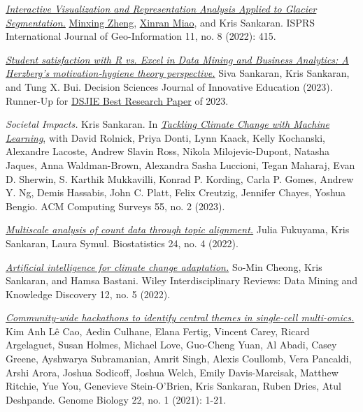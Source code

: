 \documentclass[letterpaper]{article}
\renewenvironment{itemize}{
  \begin{list}{}{
    \setlength{\leftmargin}{1.5em}
  }
}{
  \end{list}
}
\begin{document}
\begin{itemize}
  \item \href{https://doi.org/10.3390/ijgi11080415}{\textit{Interactive Visualization and Representation Analysis Applied to Glacier Segmentation.}} \underline{Minxing Zheng}, \underline{Xinran Miao}, and Kris Sankaran. ISPRS International Journal of Geo-Information 11, no. 8 (2022): 415.  
  \item \href{ https://doi.org/10.1111/dsji.12285}{\textit{Student satisfaction with R vs. Excel in Data Mining and Business Analytics: A Herzberg's motivation‐hygiene theory perspective.}} Siva Sankaran, Kris Sankaran, and Tung X. Bui. Decision Sciences Journal of Innovative Education (2023). Runner-Up for \href{https://onlinelibrary.wiley.com/pb-assets/assets/15404609/DSJIE-2023-Awards-1700644906877.pdf}{DSJIE Best Research Paper} of 2023.  
  \item \textit{Societal Impacts.} Kris Sankaran. In \href{https://dl.acm.org/doi/10.1145/3485128}{\textit{Tackling Climate Change with Machine Learning}}, with David Rolnick, Priya Donti, Lynn Kaack, Kelly Kochanski, Alexandre Lacoste, Andrew Slavin Ross, Nikola Milojevic-Dupont, Natasha Jaques, Anna Waldman-Brown, Alexandra Sasha Luccioni, Tegan Maharaj, Evan D. Sherwin, S. Karthik Mukkavilli, Konrad P. Kording, Carla P. Gomes, Andrew Y. Ng, Demis Hassabis, John C. Platt, Felix Creutzig, Jennifer Chayes, Yoshua Bengio. ACM Computing Surveys 55, no. 2 (2023).  
  \item \href{https://doi.org/10.1093/biostatistics/kxac018}{\textit{Multiscale analysis of count data through topic alignment.}} Julia Fukuyama, Kris Sankaran, Laura Symul. Biostatistics 24, no. 4 (2022).  
  \item \href{https://doi.org/10.1002/widm.1459}{\textit{Artificial intelligence for climate change adaptation.}} So-Min Cheong, Kris Sankaran, and Hamsa Bastani. Wiley Interdisciplinary Reviews: Data Mining and Knowledge Discovery 12, no. 5 (2022).  
  \item \href{https://genomebiology.biomedcentral.com/articles/10.1186/s13059-021-02433-9}{\textit{Community-wide hackathons to identify central themes in single-cell multi-omics.}} Kim Anh Lê Cao, Aedin Culhane, Elana Fertig, Vincent Carey, Ricard Argelaguet, Susan Holmes, Michael Love, Guo-Cheng Yuan, Al Abadi, Casey Greene, Ayshwarya Subramanian, Amrit Singh, Alexis Coullomb, Vera Pancaldi, Arshi Arora, Joshua Sodicoff, Joshua Welch, Emily Davis-Marcisak, Matthew Ritchie, Yue You, Genevieve Stein-O'Brien, Kris Sankaran, Ruben Dries, Atul Deshpande. Genome Biology 22, no. 1 (2021): 1-21.  

\end{itemize}
\end{document}
